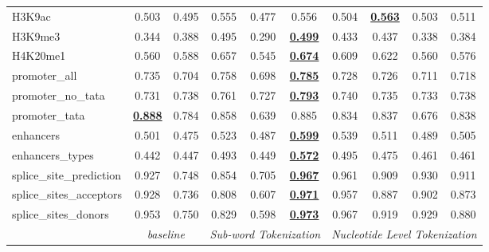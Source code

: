 \begin{table*}[h!]
\begin{center}
\begin{tabular}{l|cc|ccc|cccc}
H3K9ac & 0.503 & 0.495 & 0.555 & 0.477 & 0.556 & 0.504 & {\ul \textbf{0.563}} & 0.503 & 0.511 \\
H3K9me3 & 0.344 & 0.388 & 0.495 & 0.290 & {\ul \textbf{0.499}} & 0.433 & 0.437 & 0.338 & 0.384 \\
H4K20me1 & 0.560 & 0.588 & 0.657 & 0.545 & {\ul \textbf{0.674}} & 0.609 & 0.622 & 0.560 & 0.576 \\
promoter\_all & 0.735 & 0.704 & 0.758 & 0.698 & {\ul \textbf{0.785}} & 0.728 & 0.726 & 0.711 & 0.718 \\
promoter\_no\_tata & 0.731 & 0.738 & 0.761 & 0.727 & {\ul \textbf{0.793}} & 0.740 & 0.735 & 0.733 & 0.738 \\
promoter\_tata & {\ul \textbf{0.888}} & 0.784 & 0.858 & 0.639 & 0.885 & 0.834 & 0.837 & 0.676 & 0.838 \\
enhancers & 0.501 & 0.475 & 0.523 & 0.487 & {\ul \textbf{0.599}} & 0.539 & 0.511 & 0.489 & 0.505 \\
enhancers\_types & 0.442 & 0.447 & 0.493 & 0.449 & {\ul \textbf{0.572}} & 0.495 & 0.475 & 0.461 & 0.461 \\
splice\_site\_prediction & 0.927 & 0.748 & 0.854 & 0.705 & {\ul \textbf{0.967}} & 0.961 & 0.909 & 0.930 & 0.911 \\
splice\_sites\_acceptors & 0.928 & 0.736 & 0.808 & 0.607 & {\ul \textbf{0.971}} & 0.957 & 0.887 & 0.902 & 0.873 \\
splice\_sites\_donors & 0.953 & 0.750 & 0.829 & 0.598 & {\ul \textbf{0.973}} & 0.967 & 0.919 & 0.929 & 0.880 \\
\hline
\multicolumn{1}{l|}{} & \multicolumn{2}{c|}{\textit{baseline}} & \multicolumn{3}{c|}{\textit{Sub-word Tokenization}} & \multicolumn{4}{c}{\textit{Nucleotide Level Tokenization}} \\ \hline
\end{tabular}
\end{center}
\end{table*}